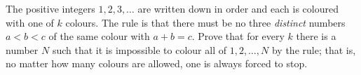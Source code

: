 The positive integers $1,2,3,\dots$ are written down in order and each is coloured with one of $k$ colours. The rule is that there must be no three \emph{distinct} numbers $a<b<c$ of the same colour with $a+b=c$. Prove that for every $k$ there is a number $N$ such that it is impossible to colour all of $1,2,\dots,N$ by the rule; that is, no matter how many colours are allowed, one is always forced to stop.
